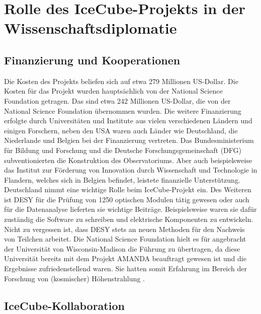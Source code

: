 \chapter{Rolle des IceCube-Projekts in der Wissenschaftsdiplomatie} 
    \vspace{8pt}

    \section{Finanzierung und Kooperationen}
    
    Die Kosten des Projekts beliefen sich auf etwa 279 Millionen US-Dollar. 
    Die Kosten für das Projekt wurden hauptsächlich von der \grqq National Science Foundation\grqq{} getragen. 
    Das sind etwa 242 Millionen US-Dollar, die von der \grqq National Science Foundation\grqq{}  übernommen wurden. 
    Die weitere Finanzierung erfolgte durch Universitäten und Institute aus vielen verschiedenen Ländern 
    und einigen Forschern, neben den USA waren auch Länder wie Deutschland, die Niederlande und Belgien 
    bei der Finanzierung vertreten. Das Bundesministerium für \grqq Bildung und Forschung\grqq{} und die 
    \grqq Deutsche Forschungsgemeinschaft\grqq{} (DFG) subventionierten die Konstruktion des Observatoriums. 
    Aber auch beispielsweise das \grqq Institut zur Förderung von Innovation durch Wissenschaft und 
    Technologie in Flandern\grqq{}, welches sich in Belgien befindet, leistete finanzielle Unterstützung.
    Deutschland nimmt eine wichtige Rolle beim IceCube-Projekt ein. Des Weiteren ist DESY für die Prüfung 
    von 1250 optischen Modulen tätig gewesen oder auch für die Datenanalyse lieferten sie wichtige Beiträge. 
    Beispielsweise waren sie dafür zuständig die Software zu schreiben und elektrische Komponenten zu 
    entwickeln. Nicht zu vergessen ist, dass DESY stets an neuen Methoden für den Nachweis von Teilchen 
    arbeitet. Die \grqq National Science Foundation\grqq{} hielt es für angebracht der Universität von 
    Wisconsin-Madison die Führung zu übertragen, da diese Universität bereits mit dem Projekt AMANDA 
    beauftragt gewesen ist und die Ergebnisse zufriedenstellend waren. Sie hatten somit Erfahrung 
    im Bereich der Forschung von (kosmischer) Höhenstrahlung \cite{FAQ13}.

    \section{IceCube-Kollaboration}

